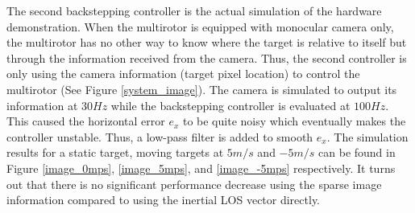 The second backstepping controller is the actual simulation of the hardware demonstration. When the multirotor is equipped with monocular camera only, the multirotor has no other way to know where the target is relative to itself but through the information received from the camera. Thus, the second controller is only using the camera information (target pixel location) to control the multirotor (See Figure \ref{system_image}). The camera is simulated to output its information at $30Hz$ while the backstepping controller is evaluated at $100Hz$. This caused the horizontal error $e_x$ to be quite noisy which eventually makes the controller unstable. Thus, a low-pass filter is added to smooth $e_x$. The simulation results for a static target, moving targets at $5m/s$ and $-5m/s$ can be found in Figure \ref{image_0mps}, \ref{image_5mps}, and \ref{image_-5mps} respectively. It turns out that there is no significant performance decrease using the sparse image information compared to using the inertial LOS vector directly. 

